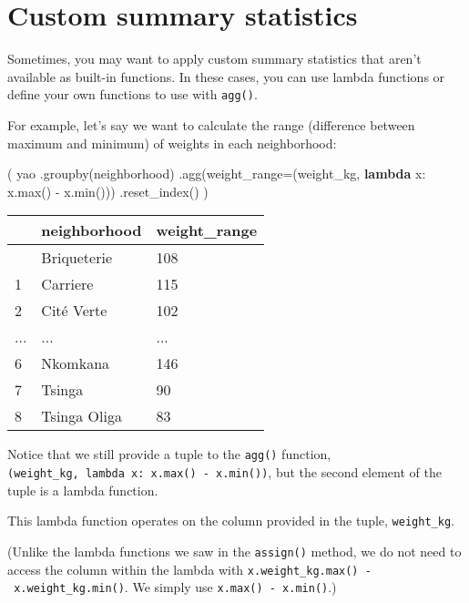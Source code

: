 \documentclass[
  letterpaper,
  DIV=11,
  numbers=noendperiod]{scrreprt}
\newenvironment{Shaded}{\begin{snugshade}}{\end{snugshade}}
\newcommand{\BuiltInTok}[1]{\textcolor[rgb]{0.00,0.23,0.31}{#1}}
\newcommand{\KeywordTok}[1]{\textcolor[rgb]{0.00,0.23,0.31}{\textbf{#1}}}
\newcommand{\NormalTok}[1]{\textcolor[rgb]{0.00,0.23,0.31}{#1}}
\newcommand{\OperatorTok}[1]{\textcolor[rgb]{0.37,0.37,0.37}{#1}}
\newcommand{\StringTok}[1]{\textcolor[rgb]{0.13,0.47,0.30}{#1}}
\begin{document}
\section{Custom summary statistics}\label{custom-summary-statistics}

Sometimes, you may want to apply custom summary statistics that aren't
available as built-in functions. In these cases, you can use lambda
functions or define your own functions to use with \texttt{agg()}.

For example, let's say we want to calculate the range (difference
between maximum and minimum) of weights in each neighborhood:

\begin{Shaded}
\begin{Highlighting}[]
\NormalTok{(}
\NormalTok{    yao}
\NormalTok{    .groupby(}\StringTok{\textquotesingle{}neighborhood\textquotesingle{}}\NormalTok{)}
\NormalTok{    .agg(weight\_range}\OperatorTok{=}\NormalTok{(}\StringTok{\textquotesingle{}weight\_kg\textquotesingle{}}\NormalTok{, }\KeywordTok{lambda}\NormalTok{ x: x.}\BuiltInTok{max}\NormalTok{() }\OperatorTok{{-}}\NormalTok{ x.}\BuiltInTok{min}\NormalTok{()))}
\NormalTok{    .reset\_index()}
\NormalTok{)}
\end{Highlighting}
\end{Shaded}

\begin{longtable}[]{@{}lll@{}}
\toprule\noalign{}
& neighborhood & weight\_range \\
\midrule\noalign{}
\endhead
\bottomrule\noalign{}
\endlastfoot
0 & Briqueterie & 108 \\
1 & Carriere & 115 \\
2 & Cité Verte & 102 \\
... & ... & ... \\
6 & Nkomkana & 146 \\
7 & Tsinga & 90 \\
8 & Tsinga Oliga & 83 \\
\end{longtable}

Notice that we still provide a tuple to the \texttt{agg()} function,
\texttt{(\textquotesingle{}weight\_kg\textquotesingle{},\ lambda\ x:\ x.max()\ -\ x.min())},
but the second element of the tuple is a lambda function.

This lambda function operates on the column provided in the tuple,
\texttt{weight\_kg}.

(Unlike the lambda functions we saw in the \texttt{assign()} method, we
do not need to access the column within the lambda with
\texttt{x.weight\_kg.max()\ -\ x.weight\_kg.min()}. We simply use
\texttt{x.max()\ -\ x.min()}.)
\end{document}
